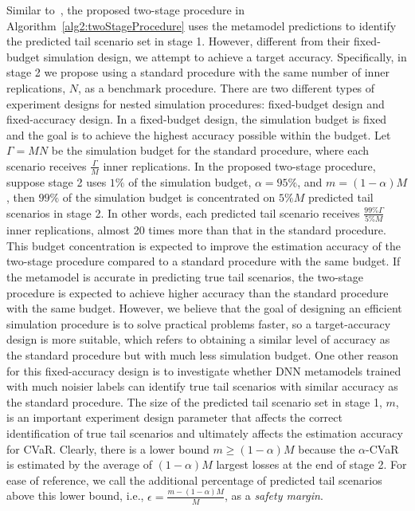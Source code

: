 Similar to~\cite{dang2020efficient}, the proposed two-stage procedure in Algorithm~\ref{alg2:twoStageProcedure} uses the metamodel predictions to identify the predicted tail scenario set in stage 1.
However, different from their fixed-budget simulation design, we attempt to achieve a target accuracy.
Specifically, in stage 2 we propose using a standard procedure with the same number of inner replications, $N$, as a benchmark procedure.
There are two different types of experiment designs for nested simulation procedures: fixed-budget design and fixed-accuracy design.
In a fixed-budget design, the simulation budget is fixed and the goal is to achieve the highest accuracy possible within the budget.
Let $\Gamma = MN$ be the simulation budget for the standard procedure, where each scenario receives $\frac{\Gamma}{M}$ inner replications.
In the proposed two-stage procedure, suppose stage 2 uses $1\%$ of the simulation budget, $\alpha = 95\%$, and $m=(1-\alpha)M$, then $99\%$ of the simulation budget is concentrated on $5\% M$ predicted tail scenarios in stage 2.
In other words, each predicted tail scenario receives $\frac{99\% \Gamma}{5\% M}$ inner replications, almost 20 times more than that in the standard procedure.
This budget concentration is expected to improve the estimation accuracy of the two-stage procedure compared to a standard procedure with the same budget. 
If the metamodel is accurate in predicting true tail scenarios, the two-stage procedure is expected to achieve higher accuracy than the standard procedure with the same budget.
However, we believe that the goal of designing an efficient simulation procedure is to solve practical problems faster, so a target-accuracy design is more suitable, which refers to obtaining a similar level of accuracy as the standard procedure but with much less simulation budget.
One other reason for this fixed-accuracy design is to investigate whether DNN metamodels trained with much noisier labels can identify true tail scenarios with similar accuracy as the standard procedure.
The size of the predicted tail scenario set in stage 1, $m$, is an important experiment design parameter that affects the correct identification of true tail scenarios and ultimately affects the estimation accuracy for CVaR.
Clearly, there is a lower bound $m \geq (1-\alpha)M$ because the $\alpha$-CVaR is estimated by the average of $(1-\alpha)M$ largest losses at the end of stage 2.
For ease of reference, we call the additional percentage of predicted tail scenarios above this lower bound, i.e., $\epsilon = \frac{m - (1-\alpha)M}{M}$, as a \textit{safety margin}.
